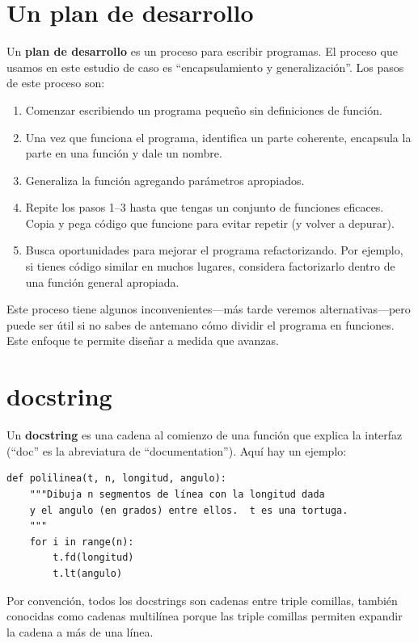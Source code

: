 \documentclass[10pt]{book}
\begin{document}
\section{Un plan de desarrollo}

Un {\bf plan de desarrollo} es un proceso para escribir programas.  El
proceso que usamos en este estudio de caso es ``encapsulamiento y
generalización''.  Los pasos de este proceso son:

\begin{enumerate}

\item Comenzar escribiendo un programa pequeño sin definiciones de función.

\item Una vez que funciona el programa, identifica un parte
  coherente, encapsula la parte en una función y dale un nombre.

\item Generaliza la función agregando parámetros apropiados.

\item Repite los pasos 1--3 hasta que tengas un conjunto de funciones eficaces.
Copia y pega código que funcione para evitar repetir (y volver a depurar).

\item Busca oportunidades para mejorar el programa refactorizando.
Por ejemplo, si tienes código similar en muchos lugares, considera
factorizarlo dentro de una función general apropiada.

\end{enumerate}

Este proceso tiene algunos inconvenientes---más tarde veremos alternativas---pero
puede ser útil si no sabes de antemano cómo dividir el
programa en funciones.  Este enfoque te permite diseñar a medida que
avanzas.


\section{docstring}
\label{docstring}

Un {\bf docstring} es una cadena al comienzo de una función que
explica la interfaz (``doc'' es la abreviatura de ``documentation'').  Aquí
hay un ejemplo:

\begin{verbatim}
def polilinea(t, n, longitud, angulo):
    """Dibuja n segmentos de línea con la longitud dada
    y el angulo (en grados) entre ellos.  t es una tortuga.
    """
    for i in range(n):
        t.fd(longitud)
        t.lt(angulo)
\end{verbatim}
%
Por convención, todos los docstrings son cadenas entre triple comillas, también conocidas
como cadenas multilínea porque las triple comillas permiten expandir
la cadena a más de una línea.
\end{document}
